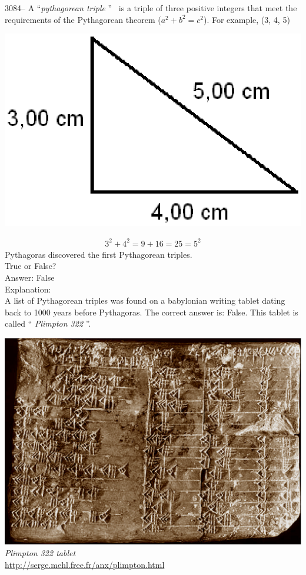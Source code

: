 \documentclass[letterpaper, 12pt]{article}
\begin{document}
3084-- A ``\emph{pythagorean triple} '' \ is a triple of three positive integers that meet the requirements of the Pythagorean theorem ($a^{2} + b^{2} = c^{2}$). For example, (3, 4, 5)\\
\begin{center}
\includegraphics[scale=0.5]{triplet345.eps}\\
\end{center}
\begin{eqnarray*}
3^{2} + 4^{2} = 9 + 16 = 25 = 5^{2}
\end{eqnarray*}
Pythagoras discovered the first Pythagorean triples.\\
True or False?\\

Answer: False\\

Explanation:\\
A list of Pythagorean triples was found on a babylonian writing tablet dating back to 1000 years before Pythagoras. The correct answer is: False. This tablet is called `` \emph{Plimpton 322} ''.
\begin{center}
\includegraphics[scale=0.25]{plimpton322.eps}\\
\emph{{\small Plimpton 322 tablet}}\\
\href{http://serge.mehl.free.fr/anx/plimpton.html}{http://serge.mehl.free.fr/anx/plimpton.html}\\[5mm]
\end{center}
\end{document}
